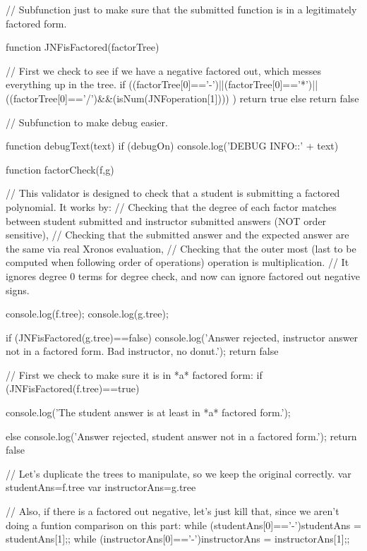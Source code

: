 \documentclass{ximera}
\begin{document}
\begin{javascript}
// Subfunction just to make sure that the submitted function is in a legitimately factored form.
 
function JNFisFactored(factorTree) {
    
    // First we check to see if we have a negative factored out, which messes everything up in the tree.
    if ((factorTree[0]=='-')||(factorTree[0]=='*')||((factorTree[0]=='/')&&(isNum(JNFoperation[1])))
    ) {return true} else {return false}
}
 
// Subfunction to make debug easier.
 
function debugText(text) {
    if (debugOn) {
    console.log('DEBUG INFO::' + text)
    }
}
 
 
 
function factorCheck(f,g) {
    // This validator is designed to check that a student is submitting a factored polynomial. It works by:
    //  Checking that the degree of each factor matches between student submitted and instructor submitted answers (NOT order sensitive),
    //  Checking that the submitted answer and the expected answer are the same via real Xronos evaluation,
    //  Checking that the outer most (last to be computed when following order of operations) operation is multiplication.
    //  It ignores degree 0 terms for degree check, and now can ignore factored out negative signs.
     
     
    console.log(f.tree);
    console.log(g.tree);
 
    if (JNFisFactored(g.tree)==false) {
        console.log('Answer rejected, instructor answer not in a factored form. Bad instructor, no donut.');
        return false
    }
     
    // First we check to make sure it is in *a* factored form:
    if (JNFisFactored(f.tree)==true) {
        console.log('The student answer is at least in *a* factored form.');
         
         
    } else {
        console.log('Answer rejected, student answer not in a factored form.');
        return false
    }
     
    // Let's duplicate the trees to manipulate, so we keep the original correctly.
    var studentAns=f.tree
    var instructorAns=g.tree
     
    // Also, if there is a factored out negative, let's just kill that, since we aren't doing a funtion comparison on this part:
    while (studentAns[0]=='-'){studentAns = studentAns[1];};
    while (instructorAns[0]=='-'){instructorAns = instructorAns[1];};
     
}
\end{javascript}
\end{document}
